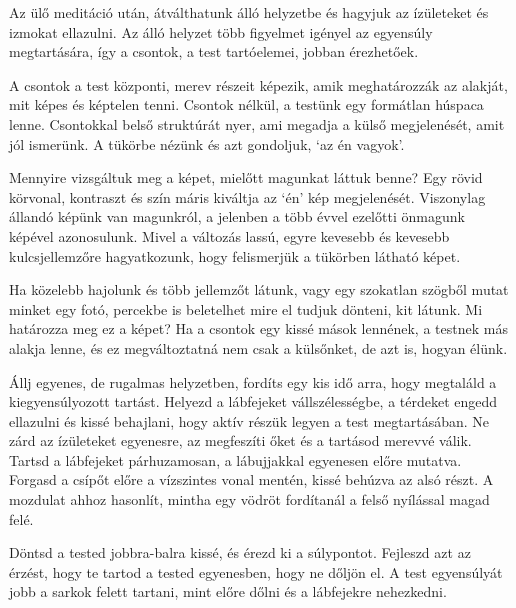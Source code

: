 
Az ülő meditáció után, átválthatunk álló helyzetbe és hagyjuk az
ízületeket és izmokat ellazulni. Az álló helyzet több figyelmet igényel
az egyensúly megtartására, így a csontok, a test tartóelemei, jobban
érezhetőek.

A csontok a test központi, merev részeit képezik, amik meghatározzák az
alakját, mit képes és képtelen tenni. Csontok nélkül, a testünk egy
formátlan húspaca lenne. Csontokkal belső struktúrát nyer, ami megadja a
külső megjelenését, amit jól ismerünk. A tükörbe nézünk és azt
gondoljuk, `az én vagyok'.

\clearpage
{}%
%
\label{illus-standing-meditation}%
\clearpage

Mennyire vizsgáltuk meg a képet, mielőtt magunkat láttuk benne? Egy
rövid körvonal, kontraszt és szín máris kiváltja az `én' kép
megjelenését. Viszonylag állandó képünk van magunkról, a jelenben a több
évvel ezelőtti önmagunk képével azonosulunk. Mivel a változás lassú,
egyre kevesebb és kevesebb kulcsjellemzőre hagyatkozunk, hogy
felismerjük a tükörben látható képet.

Ha közelebb hajolunk és több jellemzőt látunk, vagy egy szokatlan
szögből mutat minket egy fotó, percekbe is beletelhet mire el tudjuk
dönteni, kit látunk. Mi határozza meg ez a képet? Ha a csontok egy kissé
mások lennének, a testnek más alakja lenne, és ez megváltoztatná nem
csak a külsőnket, de azt is, hogyan élünk.


Állj egyenes, de rugalmas helyzetben, fordíts egy kis idő arra, hogy
megtaláld a kiegyensúlyozott tartást. Helyezd a lábfejeket
vállszélességbe, a térdeket engedd ellazulni és kissé behajlani, hogy
aktív részük legyen a test megtartásában. Ne zárd az ízületeket
egyenesre, az megfeszíti őket és a tartásod merevvé válik. Tartsd a
lábfejeket párhuzamosan, a lábujjakkal egyenesen előre mutatva. Forgasd
a csípőt előre a vízszintes vonal mentén, kissé behúzva az alsó részt. A
mozdulat ahhoz hasonlít, mintha egy vödröt fordítanál a felső nyílással
magad felé.

Döntsd a tested jobbra-balra kissé, és érezd ki a súlypontot. Fejleszd
azt az érzést, hogy te tartod a tested egyenesben, hogy ne dőljön el. A
test egyensúlyát jobb a sarkok felett tartani, mint előre dőlni és a
lábfejekre nehezkedni.

